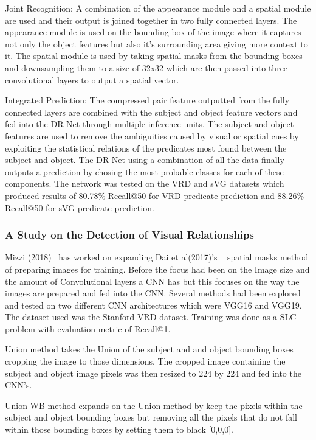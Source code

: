 \documentclass{csfyp}
\begin{document}
Joint Recognition:
A combination of the appearance module and a spatial module are used and their output is joined together in two fully connected layers. The appearance module is used on the bounding box of the image where it captures not only the object features but also it’s surrounding area giving more context to it. The spatial module is used by taking spatial masks from the bounding boxes and downsampling them to a size of 32x32 which are then passed into three convolutional layers to output a spatial vector. 

Integrated Prediction:
The compressed pair feature outputted from the fully connected layers are combined with the subject and object feature vectors and fed into the DR-Net through multiple inference units. The subject and object features are used to remove the ambiguities caused by visual or spatial cues by exploiting the statistical relations of the predicates most found between the subject and object. The DR-Net using a combination of all the data finally outputs a prediction by chosing the most probable classes for each of these components. 
The network was tested on the VRD and sVG datasets which produced results of 80.78\% Recall@50 for VRD predicate prediction and 88.26\% Recall@50 for sVG predicate prediction.


\subsubsection{A Study on the Detection of Visual Relationships}
Mizzi (2018)~\cite{detectionRelationships} has worked on expanding Dai et al(2017)'s ~\cite{Dai2017DetectingVR} spatial masks method of preparing images for training. Before the focus had been on the Image size and the amount of Convolutional layers a CNN has but this focuses on the way the images are prepared and fed into the CNN. Several methods had been explored and tested on two different CNN architectures which were VGG16 and VGG19. The dataset used was the Stanford VRD dataset.  Training was done as a SLC problem with evaluation metric of Recall@1.

Union method takes the Union of the subject and and object bounding boxes cropping the image to those dimensions. The cropped image containing the subject and object image pixels was then resized to 224 by 224 and fed into the CNN’s.

Union-WB method expands on the Union method by keep the pixels within the subject and object bounding boxes but removing all the pixels that do not fall within those bounding boxes by setting them to black [0,0,0]. 
\end{document}
